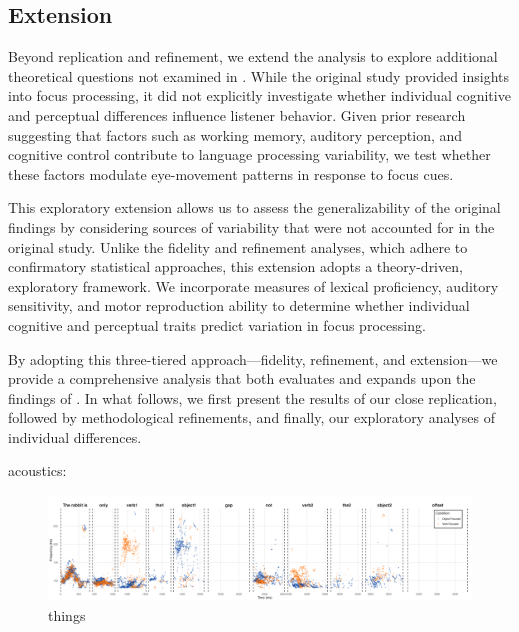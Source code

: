 \subsection{Extension}

Beyond replication and refinement, we extend the analysis to explore additional theoretical questions not examined in \citep{Ge2021}. While the original study provided insights into focus processing, it did not explicitly investigate whether individual cognitive and perceptual differences influence listener behavior. Given prior research suggesting that factors such as working memory, auditory perception, and cognitive control contribute to language processing variability, we test whether these factors modulate eye-movement patterns in response to focus cues.

This exploratory extension allows us to assess the generalizability of the original findings by considering sources of variability that were not accounted for in the original study. Unlike the fidelity and refinement analyses, which adhere to confirmatory statistical approaches, this extension adopts a theory-driven, exploratory framework. We incorporate measures of lexical proficiency, auditory sensitivity, and motor reproduction ability to determine whether individual cognitive and perceptual traits predict variation in focus processing.

By adopting this three-tiered approach—fidelity, refinement, and extension—we provide a comprehensive analysis that both evaluates and expands upon the findings of \citep{Ge2021}. In what follows, we first present the results of our close replication, followed by methodological refinements, and finally, our exploratory analyses of individual differences.

acoustics:
\begin{figure}[H]  %
    \centering
    \includegraphics[width=\textwidth,height=\textheight,keepaspectratio]{viz/accoustic.png}
    \caption{things}
    \label{fig:acoustic}
\end{figure}

